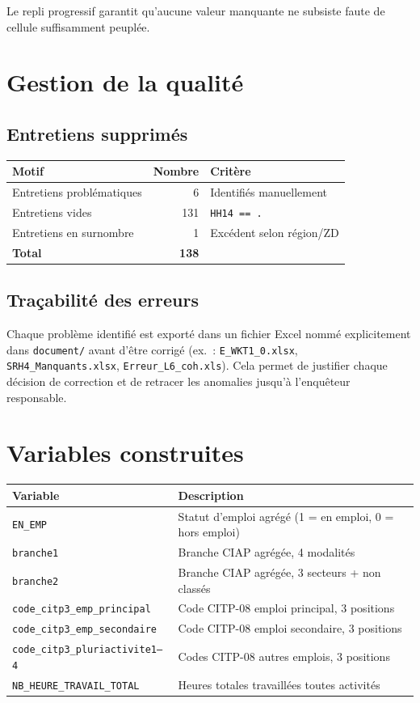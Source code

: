 \documentclass[11pt, a4paper]{article}
\begin{document}
Le repli progressif garantit qu'aucune valeur manquante ne subsiste
faute de cellule suffisamment peuplée.

\section{Gestion de la qualité}

\subsection{Entretiens supprimés}

\begin{tabular}{lrl}
\toprule
\textbf{Motif} & \textbf{Nombre} & \textbf{Critère} \\
\midrule
Entretiens problématiques & 6 & Identifiés manuellement \\
Entretiens vides & 131 & \texttt{HH14 == .} \\
Entretiens en surnombre & 1 & Excédent selon région/ZD \\
\midrule
\textbf{Total} & \textbf{138} & \\
\bottomrule
\end{tabular}

\subsection{Traçabilité des erreurs}

Chaque problème identifié est exporté dans un fichier Excel nommé explicitement
dans \texttt{document/} avant d'être corrigé (ex.~: \texttt{E\_WKT1\_0.xlsx},
\texttt{SRH4\_Manquants.xlsx}, \texttt{Erreur\_L6\_coh.xls}).
Cela permet de justifier chaque décision de correction et de retracer
les anomalies jusqu'à l'enquêteur responsable.

\section{Variables construites}

\begin{longtable}{@{}lp{9.5cm}@{}}
\toprule
\textbf{Variable} & \textbf{Description} \\
\midrule
\texttt{EN\_EMP} & Statut d'emploi agrégé (1 = en emploi, 0 = hors emploi) \\
\texttt{branche1} & Branche CIAP agrégée, 4 modalités \\
\texttt{branche2} & Branche CIAP agrégée, 3 secteurs + non classés \\
\texttt{code\_citp3\_emp\_principal} & Code CITP-08 emploi principal, 3 positions \\
\texttt{code\_citp3\_emp\_secondaire} & Code CITP-08 emploi secondaire, 3 positions \\
\texttt{code\_citp3\_pluriactivite1--4} & Codes CITP-08 autres emplois, 3 positions \\
\texttt{NB\_HEURE\_TRAVAIL\_TOTAL} & Heures totales travaillées toutes activités \\
\bottomrule
\end{longtable}
\end{document}
